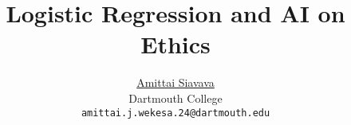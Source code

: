
\usepackage{arxiv}
\usepackage{amsmath, amsfonts, amsthm, amssymb, amscd, amsxtra}
\usepackage[utf8]{inputenc} %
\usepackage[T1]{fontenc}    %
\usepackage{hyperref}       %
\usepackage{url}            %
\usepackage{booktabs}       %
\usepackage{amsfonts}       %
\usepackage{nicefrac}       %
\usepackage{microtype}      %
\usepackage{cleveref}       %
\usepackage{lipsum}         %
\usepackage{graphicx}
\usepackage{doi}
\usepackage[backend=bibtex,style=numeric]{biblatex}
\usepackage{pgfplots}
\pgfplotsset{compat=1.18}

\usepackage{subcaption}
\usepackage{array, multirow}

\usepackage{float}

\usepackage{enumitem}

\newenvironment{enumalph}{
  \begin{enumerate}[label=(\alph*)]
}{\end{enumerate}}

\newenvironment{enumroman}{
  \begin{enumerate}[label=(\roman*)]
}{\end{enumerate}}

\newenvironment{enumarabic}{
  \begin{enumerate}[label=\textbf{\arabic*.}]
}{\end{enumerate}}

\newenvironment{enumarabic*}{
  \begin{enumerate}[label*=\textbf{\arabic*.}]
}{\end{enumerate}}


\title{Logistic Regression and AI on Ethics}
\author{
	\href{https://amittai.studio}{Amittai Siavava} \\
		Dartmouth College \\
		\texttt{amittai.j.wekesa.24@dartmouth.edu}
}

\renewcommand{\headeright}{Assignment Report}
\renewcommand{\undertitle}{Assignment Report}
\renewcommand{\shorttitle}{}




